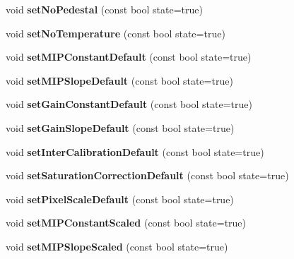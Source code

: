 \begin{DoxyCompactItemize}
\item 
void {\bfseries set\-No\-Pedestal} (const bool state=true)\label{classCALICE_1_1SiPMCalibrationStatusBits_a99d08b349011e1904c2ce7a56be12893}

\item 
void {\bfseries set\-No\-Temperature} (const bool state=true)\label{classCALICE_1_1SiPMCalibrationStatusBits_a630a720aba57bd87f374f905137afc61}

\item 
void {\bfseries set\-M\-I\-P\-Constant\-Default} (const bool state=true)\label{classCALICE_1_1SiPMCalibrationStatusBits_a61830eda8bad52c93a0d52ee894b9ca6}

\item 
void {\bfseries set\-M\-I\-P\-Slope\-Default} (const bool state=true)\label{classCALICE_1_1SiPMCalibrationStatusBits_a18239f598a72b273408ed87621468771}

\item 
void {\bfseries set\-Gain\-Constant\-Default} (const bool state=true)\label{classCALICE_1_1SiPMCalibrationStatusBits_abe90e6545d8a9642a983b9a06918ea21}

\item 
void {\bfseries set\-Gain\-Slope\-Default} (const bool state=true)\label{classCALICE_1_1SiPMCalibrationStatusBits_ae4dbfe58c224c7fd091df561b6bf8d9f}

\item 
void {\bfseries set\-Inter\-Calibration\-Default} (const bool state=true)\label{classCALICE_1_1SiPMCalibrationStatusBits_a26a1bd1746575ed33d4a29da9a8d5616}

\item 
void {\bfseries set\-Saturation\-Correction\-Default} (const bool state=true)\label{classCALICE_1_1SiPMCalibrationStatusBits_a6769ef0abfbf1b7a4a04299e59f1702f}

\item 
void {\bfseries set\-Pixel\-Scale\-Default} (const bool state=true)\label{classCALICE_1_1SiPMCalibrationStatusBits_a8fd2d178a271756f146c16b12a457cb1}

\item 
void {\bfseries set\-M\-I\-P\-Constant\-Scaled} (const bool state=true)\label{classCALICE_1_1SiPMCalibrationStatusBits_af3e46a6c99e475a7985342b4d5c35bbe}

\item 
void {\bfseries set\-M\-I\-P\-Slope\-Scaled} (const bool state=true)\label{classCALICE_1_1SiPMCalibrationStatusBits_a9cc049cf6b14c909f125a685d55f8c47}


\end{DoxyCompactItemize}
